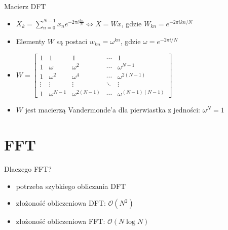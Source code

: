 \documentclass[polish, 12pt, aspectratio=169]{beamer}
\begin{document}
\begin{frame}{Macierz DFT}
    \begin{itemize}[<+->]
        \item \( X_k = \sum_{n=0}^{N-1} x_n e^{-2\pi i \frac{kn}{N}} \Longleftrightarrow X = Wx\), gdzie \( W_{kn} = e^{-2\pi i kn / N} \)
        \item Elementy \(W\) są postaci \( w_{kn} = \omega^{kn} \), gdzie \( \omega = e^{-2\pi i / N} \)
        \item \(W = \begin{bmatrix}
            1 & 1 & 1 & \cdots & 1 \\
            1 & \omega & \omega^2 & \cdots & \omega^{N-1} \\
            1 & \omega^2 & \omega^4 & \cdots & \omega^{2(N-1)} \\
            \vdots & \vdots & \vdots & \ddots & \vdots \\
            1 & \omega^{N-1} & \omega^{2(N-1)} & \cdots & \omega^{(N-1)(N-1)}
        \end{bmatrix}\)
        \item \(W\) jest macierzą Vandermonde'a dla pierwiastka z jedności: \(\omega^N = 1\)
    \end{itemize}
\end{frame}

\section[FFT \\ {\normalsize Fast Fourier Transform}]{FFT}

\begin{frame}{Dlaczego FFT?}
    \begin{itemize}
        \item potrzeba szybkiego obliczania DFT
        \item złożoność obliczeniowa DFT\@: \( \mathcal{O}(N^2) \)
        \item<2|alert@2> złożoność obliczeniowa FFT\@: \( \mathcal{O}(N \log N) \)
    \end{itemize}
\end{frame}
\end{document}
